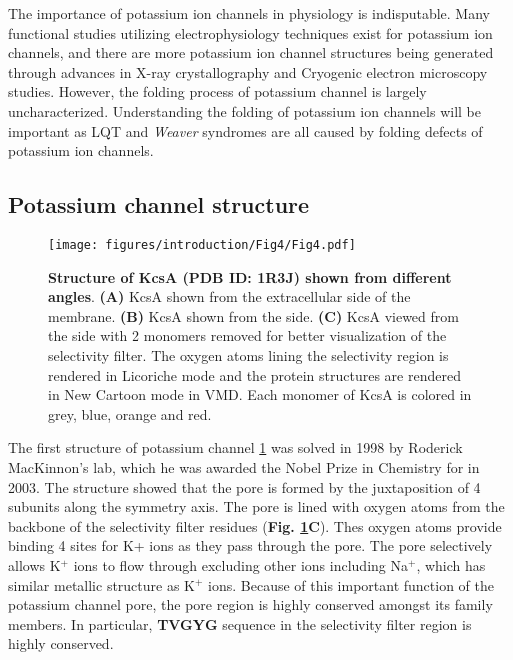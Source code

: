 The importance of potassium ion channels in physiology is indisputable. Many functional studies utilizing electrophysiology techniques exist for potassium ion channels, and there are more potassium ion channel structures being generated through advances in X-ray crystallography and Cryogenic electron microscopy studies. However, the folding process of potassium channel is largely uncharacterized. Understanding the folding of potassium ion channels will be important as LQT and \textit{Weaver} syndromes are all caused by folding defects of potassium ion channels.

\subsection{Potassium channel structure}

\begin{figure}[!ht]
\begin{center}
	\texttt{[image: figures/introduction/Fig4/Fig4.pdf]}
\end{center}
	\caption{\textbf{Structure of KcsA (PDB ID: 1R3J) shown from different angles}. \textbf{(A)} KcsA shown from the extracellular side of the membrane. \textbf{(B)} KcsA shown from the side. \textbf{(C)} KcsA viewed from the side with 2 monomers removed for better visualization of the selectivity filter. The oxygen atoms lining the selectivity region is rendered in Licoriche mode and the protein structures are rendered in New Cartoon mode in VMD. Each monomer of KcsA is colored in grey, blue, orange and red.}
	\label{fig:intro_f4}
\end{figure}

The first structure of potassium channel \ref{fig:intro_f4} was solved in 1998 by Roderick MacKinnon's lab, which he was awarded the Nobel Prize in Chemistry for in 2003. The structure showed that the pore is formed by the juxtaposition of 4 subunits along the symmetry axis. The pore is lined with oxygen atoms from the backbone of the selectivity filter residues (\textbf{Fig. \ref{fig:intro_f4}C}). Thes oxygen atoms provide binding 4 sites for K+ ions as they pass through the pore. The pore selectively allows K$^{+}$ ions to flow through excluding other ions including Na$^{+}$, which has similar metallic structure as K$^{+}$ ions. Because of this important function of the potassium channel pore, the pore region is highly conserved amongst its family members. In particular, \textbf{TVGYG} sequence in the selectivity filter region is highly conserved. 

